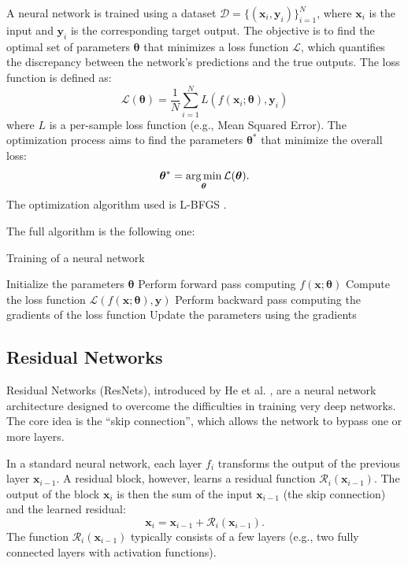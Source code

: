 A neural network is trained using a dataset \( \mathcal{D} = \{(\bm{x}_i, \bm{y}_i)\}_{i=1}^N \), where \( \bm{x}_i \) is the input and \( \bm{y}_i \) is the corresponding target output. The objective is to find the optimal set of parameters \( \bm{\theta} \) that minimizes a loss function \( \mathcal{L} \), which quantifies the discrepancy between the network's predictions and the true outputs. The loss function is defined as:
\begin{equation}
    \mathcal{L}(\bm{\theta}) = \frac{1}{N} \sum_{i=1}^N L(f(\bm{x}_i; \bm{\theta}), \bm{y}_i)
\end{equation}
where \( L \) is a per-sample loss function (e.g., Mean Squared Error). The optimization process aims to find the parameters \( \bm{\theta}^* \) that minimize the overall loss:
\begin{equation}
    \bm{\theta}^* = \operatorname*{arg\,min}_{\bm{\theta}} \mathcal{L}(\bm{\theta}).
\end{equation}
The optimization algorithm used is L-BFGS \cite{Liu_1989}.

The full algorithm is the following one:
\begin{algorithm} 
    \caption{Training of a neural network}
    \begin{algorithmic}
        \State Initialize the parameters \( \bm{\theta} \)
                \State Perform forward pass computing \( f(\bm{x}; \bm{\theta}) \)
                \State Compute the loss function \( \mathcal{L}(f(\bm{x}; \bm{\theta}), \bm{y}) \)
                \State Perform backward pass computing the gradients of the loss function
                \State Update the parameters using the gradients
            \EndFor
        \EndWhile
    \end{algorithmic}
\end{algorithm}

\subsection{Residual Networks}

Residual Networks (ResNets), introduced by He et al. \cite{He_Zhang_Ren_Sun_2015}, are a neural network architecture designed to overcome the difficulties in training very deep networks. The core idea is the ``skip connection'', which allows the network to bypass one or more layers.

In a standard neural network, each layer \(f_i\) transforms the output of the previous layer \( \bm{x}_{i-1} \). A residual block, however, learns a residual function \( \mathcal{R}_i(\bm{x}_{i-1}) \). The output of the block \( \bm{x}_i \) is then the sum of the input \( \bm{x}_{i-1} \) (the skip connection) and the learned residual:
\begin{equation}
    \bm{x}_i = \bm{x}_{i-1} + \mathcal{R}_i(\bm{x}_{i-1}).
\end{equation}
The function \( \mathcal{R}_i(\bm{x}_{i-1}) \) typically consists of a few layers (e.g., two fully connected layers with activation functions).

